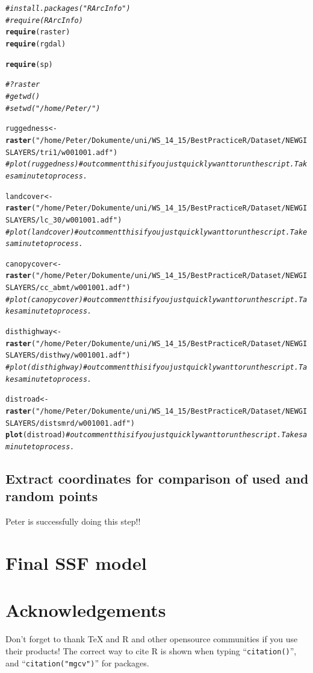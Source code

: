 \documentclass[11pt, a4paper]{article}\usepackage[]{graphicx}\usepackage[]{color}
\makeatletter
\newcommand{\hlstr}[1]{\textcolor[rgb]{0.192,0.494,0.8}{#1}}%
\newcommand{\hlcom}[1]{\textcolor[rgb]{0.678,0.584,0.686}{\textit{#1}}}%
\newcommand{\hlstd}[1]{\textcolor[rgb]{0.345,0.345,0.345}{#1}}%
\newcommand{\hlkwb}[1]{\textcolor[rgb]{0.69,0.353,0.396}{#1}}%
\newcommand{\hlkwd}[1]{\textcolor[rgb]{0.737,0.353,0.396}{\textbf{#1}}}%
\newenvironment{kframe}{%
 \def\at@end@of@kframe{}%
 \ifinner\ifhmode%
  \def\at@end@of@kframe{\end{minipage}}%
  \begin{minipage}{\columnwidth}%
 \fi\fi%
 \def\FrameCommand##1{\hskip\@totalleftmargin \hskip-\fboxsep
 \colorbox{shadecolor}{##1}\hskip-\fboxsep
     \hskip-\linewidth \hskip-\@totalleftmargin \hskip\columnwidth}%
 \MakeFramed {\advance\hsize-\width
   \@totalleftmargin\z@ \linewidth\hsize
   \@setminipage}}%
 {\par\unskip\endMakeFramed%
 \at@end@of@kframe}
\newenvironment{knitrout}{}{} %
\makeatother
\begin{document}
\begin{knitrout}
\color{fgcolor}\begin{kframe}
\begin{alltt}
\hlcom{#install.packages("RArcInfo")}
\hlcom{#require(RArcInfo)}
\hlkwd{require}\hlstd{(raster)}
\hlkwd{require}\hlstd{(rgdal)}

\hlkwd{require}\hlstd{(sp)}


\hlcom{#?raster}
\hlcom{#getwd()}
\hlcom{#setwd("/home/Peter/")}

\hlstd{ruggedness} \hlkwb{<-} \hlkwd{raster}\hlstd{(}\hlstr{"/home/Peter/Dokumente/uni/WS_14_15/Best Practice R/Dataset/NEW GIS LAYERS/tri1/w001001.adf"}\hlstd{)}
\hlcom{# plot(ruggedness) # outcomment this if you just quickly want to run the script. Takes a minute to process.}

\hlstd{landcover} \hlkwb{<-} \hlkwd{raster}\hlstd{(}\hlstr{"/home/Peter/Dokumente/uni/WS_14_15/Best Practice R/Dataset/NEW GIS LAYERS/lc_30/w001001.adf"}\hlstd{)}
\hlcom{# plot(landcover) # outcomment this if you just quickly want to run the script. Takes a minute to process.}

\hlstd{canopycover} \hlkwb{<-} \hlkwd{raster}\hlstd{(}\hlstr{"/home/Peter/Dokumente/uni/WS_14_15/Best Practice R/Dataset/NEW GIS LAYERS/cc_abmt/w001001.adf"}\hlstd{)}
\hlcom{# plot(canopycover) # outcomment this if you just quickly want to run the script. Takes a minute to process.}

\hlstd{disthighway} \hlkwb{<-} \hlkwd{raster}\hlstd{(}\hlstr{"/home/Peter/Dokumente/uni/WS_14_15/Best Practice R/Dataset/NEW GIS LAYERS/disthwy/w001001.adf"}\hlstd{)}
\hlcom{# plot(disthighway) # outcomment this if you just quickly want to run the script. Takes a minute to process.}

\hlstd{distroad} \hlkwb{<-} \hlkwd{raster}\hlstd{(}\hlstr{"/home/Peter/Dokumente/uni/WS_14_15/Best Practice R/Dataset/NEW GIS LAYERS/distsmrd/w001001.adf"}\hlstd{)}
\hlkwd{plot}\hlstd{(distroad)} \hlcom{# outcomment this if you just quickly want to run the script. Takes a minute to process.}
\end{alltt}
\end{kframe}
\end{knitrout}


\subsection{Extract coordinates for comparison of used and random points} %
Peter is successfully doing this step!!

\section{Final SSF model}


\section{Acknowledgements}
Don't forget to thank TeX and R and other opensource communities if you use their products! The correct way to cite R is shown when typing ``\texttt{citation()}'', and ``\texttt{citation("mgcv")}'' for packages.
\end{document}
